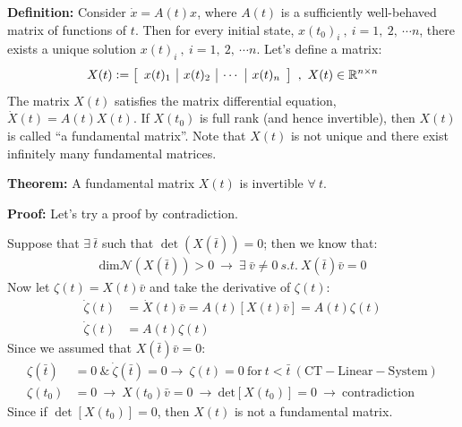 \documentclass[twoside]{article}
\begin{document}
\textbf{Definition:} Consider $\dot{x} = A(t) x$, where $A(t)$ is a sufficiently well-behaved matrix of functions of $t$. Then for every initial state, 
$x(t_0)_i \ , \ i = 1, \ 2, \ \cdots n $, there exists a unique solution $x(t)_i \ , \ i = 1, \ 2, \ \cdots n $. Let's define a matrix:
%
\begin{align*}
X(t) \vcentcolon= \left[ \begin{array}{c|c|c|c} x(t)_1 & x(t)_2 & \cdots & x(t)_n \end{array} \right] \ , \ X(t) \in \mathbb{R}^{n \times n}
\end{align*}
%
The matrix $X(t)$ satisfies the matrix differential equation, $\dot{X}(t) = A(t) X(t)$. If $X(t_0)$ is full rank (and hence invertible), then $X(t)$ is called ``a fundamental matrix''. Note that $X(t)$ is not unique and there exist infinitely many fundamental matrices. 

\vspace{6pt}

\begin{mdframed}[backgroundcolor=black!5, linecolor=black!20]
\textbf{Theorem:} A fundamental matrix $X(t)$ is invertible $\forall \ t$.
\end{mdframed}

\textbf{Proof:} Let's try a proof by contradiction. 

Suppose that $\exists \ \bar{t}$ such that $\det( X(\bar{t}) ) = 0$; then we know that:
%
\begin{align*}
	\mathrm{dim} \mathcal{N}\left( X(\bar{t}) \right) > 0 \ \rightarrow \ \exists \ \bar{v}\neq0 \ s.t. \ X(\bar{t}) \bar{v} = 0
\end{align*}
%
Now let $\zeta(t) = X(t) \bar{v}$ and take the derivative of $\zeta(t)$:
%
\begin{align*}
	\dot{\zeta}(t) &= \dot{X}(t) \bar{v} = A(t) \left[ X(t) \bar{v} \right] = A(t) \zeta(t)
	\\
	\dot{\zeta}(t) &= A(t) \zeta(t)
\end{align*}
%
Since we assumed that $X(\bar{t}) \bar{v} = 0$:
%
\begin{align*}
	\zeta(\bar{t}) &= 0 \ \& \ \dot{\zeta}(\bar{t}) = 0 \rightarrow \ \zeta(t) = 0 \ \mathrm{for} \ t < \bar{t} \ \mathrm{(CT-Linear-System)}
	\\
	\zeta(t_0) &= 0 \ \rightarrow \ X(t_0) \bar{v} = 0 \ \rightarrow \ \mathrm{det}[X(t_0)]=0 \ \rightarrow \ \mathrm{contradiction}
\end{align*}
%
Since if $\det[X(t_0)]=0$, then $X(t)$ is not a fundamental matrix. 
\end{document}
